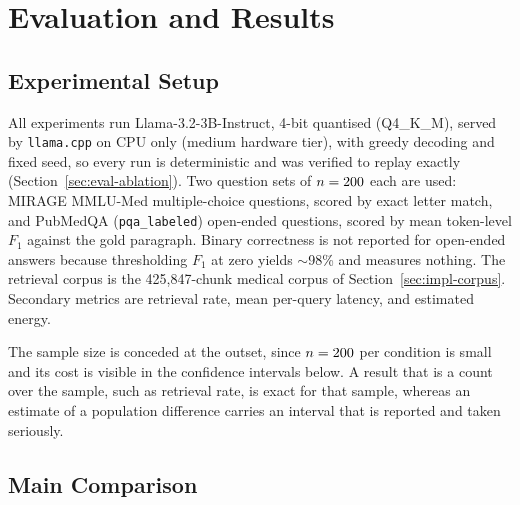 \chapter{Evaluation and Results}
\label{ch:eval}

\section{Experimental Setup}
\label{sec:eval-setup}

All experiments run Llama-3.2-3B-Instruct, 4-bit quantised (Q4\_K\_M),
served by \texttt{llama.cpp} on CPU only (medium hardware tier), with greedy
decoding and fixed seed, so every run is deterministic and was verified to
replay exactly (Section~\ref{sec:eval-ablation}). Two question sets of
$n=200{}$ each are used: MIRAGE MMLU-Med multiple-choice questions,
scored by exact letter match, and PubMedQA (\texttt{pqa\_labeled}) open-ended
questions, scored by mean token-level $F_1$ against the gold paragraph.
Binary correctness is not reported for open-ended answers because
thresholding $F_1$ at zero yields $\sim$98\% and measures nothing. The
retrieval corpus is the 425,847-chunk medical corpus of
Section~\ref{sec:impl-corpus}. Secondary metrics are retrieval rate, mean
per-query latency, and estimated energy.

The sample size is conceded at the outset, since $n=200{}$ per
condition is small and its cost is visible in the confidence intervals below.
A result that is a count over the sample, such as retrieval rate, is exact for
that sample, whereas an estimate of a population difference carries an
interval that is reported and taken seriously.

\section{Main Comparison}
\label{sec:eval-main}


